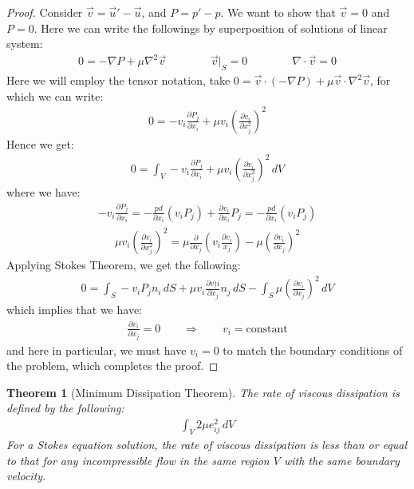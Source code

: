 \documentclass[11pt]{book}
\theoremstyle{break}
\theoremstyle{break}
\newtheorem{thm}{Theorem}[section]
\newcommand{\pd}{\partial}
\begin{document}
\begin{proof}
Consider $\vec{v} = \vec{u}' - \vec{u}$, and $P = p' - p$. We want to show that $\vec{v} = 0$ and $P = 0$. Here we can write the followings by superposition of solutions of linear system:
\begin{align*}
0 = -\nabla P + \mu \nabla^2 \vec{v}\qquad\qquad \vec{v}|_{S} = 0 \qquad\qquad \nabla \cdot \vec{v} = 0
\end{align*}
Here we will employ the tensor notation, take $0 = \vec{v} \cdot (-\nabla P) + \mu \vec{v}\cdot \nabla^2 \vec{v}$, for which we can write:
\begin{align*}
0 = -v_i \frac{\pd P_j}{\pd x_i} + \mu v_i \left(\frac{\pd v_i}{\pd x_j^2}\right)^2
\end{align*}
Hence we get:
\begin{align*}
0 = \int_V  -v_i \frac{\pd P_j}{\pd x_i} + \mu v_i \left(\frac{\pd v_i}{\pd x_j^2}\right)^2\, dV
\end{align*}
where we have:
\begin{align*}
-v_i \frac{\pd P_j}{\pd x_i} = -\frac{pd }{\pd x_i}( v_i P_j) + \frac{\pd v_i}{\pd x_i} P_j = -\frac{pd }{\pd x_i}( v_i P_j) 
\end{align*}
\begin{align*}
 \mu v_i \left(\frac{\pd v_i}{\pd x_j^2}\right)^2 = \mu \frac{\pd}{\pd x_j}\left( v_i \frac{\pd v_i}{x_j}\right) - \mu \left( \frac{\pd v_i}{\pd x_j}\right)^2
\end{align*}
Applying Stokes Theorem, we get the following:
\begin{align*}
0 = \int_S -v_i P_j n_i \, dS + \mu v_i \frac{\pd v)i}{\pd x_j}n_j \, dS  - \int_S \mu \left( \frac{\pd v_i}{\pd x_j}\right)^2\, dV
\end{align*}
which implies that we have:
\begin{align*}
\frac{\pd v_i}{\pd x_j} = 0 \qquad \Rightarrow \qquad v_i = \text{constant}
\end{align*}
and here in particular, we must have $v_i = 0$ to match the boundary conditions of the problem, which completes the proof. 
\end{proof}

\begin{thm}[Minimum Dissipation Theorem]
The rate of viscous dissipation is defined by the following:
\begin{align*}
\int_V 2\mu e_{ij}^2\, dV
\end{align*}
For a Stokes equation solution, the rate of viscous dissipation is less than or equal to that for any incompressible flow in the same region $V$ with the same boundary velocity. 
\end{thm}
\end{document}
